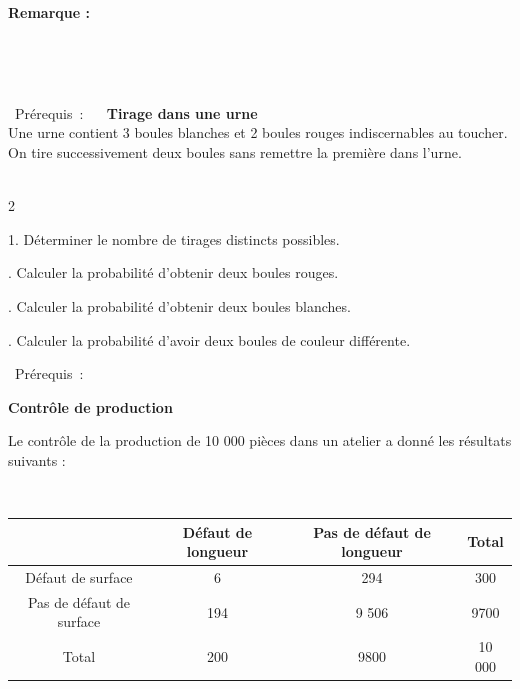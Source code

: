 \documentclass[11pt,a4paper]{article}
\newcommand{\bpre}[1]
{\begin{bclogo}[couleur = white,logo=\bcinfo , arrondi = 0.1]
{~\normalsize Prérequis~:}
~~
{#1}
~~
\end{bclogo}}
\newcommand{\cadre}[1]
{\begin{bclogo}[couleur = white,logo=,  arrondi = 0.1,barre=none]
~~
{%
\rule{0mm}{#1mm}}\par
\medskip
~~
\end{bclogo}}
\newcommand{\cadreblanc}[1]{%
\medskip\framebox[\linewidth][c]{%
\rule{0mm}{#1mm}}\par
\medskip}
\begin{document}
\textbf{Remarque : }\\
\cadre{1}
\vspace{0.5cm}



 \vspace{2mm}

\bpre{\textbf{Tirage dans une urne } \\
 \vspace{-2mm}
Une urne contient 3 boules blanches et 2 boules rouges indiscernables au toucher.
On tire successivement deux boules sans remettre la première dans l'urne. \\[2pt]
}
\begin{multicols}{2}
~~\\
\begin{center}

    
\end{center}

1. Déterminer le nombre de tirages distincts possibles.\\[1pt]
\cadreblanc{8}
2. Calculer la probabilité d'obtenir deux boules rouges.\\[1pt]
\cadreblanc{8}
3. Calculer la probabilité d'obtenir deux boules blanches.\\[1pt]
\cadreblanc{8}
4. Calculer la probabilité d'avoir deux boules de couleur différente. \\[1pt]
\cadreblanc{8}

\end{multicols}

\bpre{\textbf{Contrôle de production}

Le contrôle de la production de 10 000 pièces dans un atelier a donné les résultats suivants : }
\begin{center}
\begin{tabular} { | c | c | c | c | }
   \hline
      & Défaut de longueur & Pas de défaut de longueur & Total \\
   \hline 
   Défaut de surface  & 6 & 294 & 300\\
   \hline
   Pas de défaut de surface   &194& 9 506&  9700\\
   \hline
   Total  & 200 & 9800 & 10 000  \\
   \hline
 \end{tabular}
\end{center}
\end{document}
